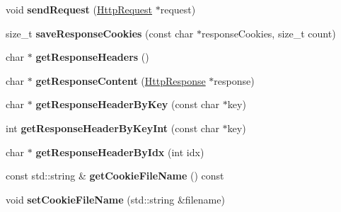 \begin{DoxyCompactItemize}
\mbox{\label{classnetwork_1_1HttpURLConnection_a83c0589023e5e1a82df8c7ce4e52a8de}} 
void {\bfseries send\+Request} (\hyperlink{classnetwork_1_1HttpRequest}{Http\+Request} $\ast$request)
\item 
\mbox{\label{classnetwork_1_1HttpURLConnection_a74069d196ac2556cbb0e0446bbc59b58}} 
size\+\_\+t {\bfseries save\+Response\+Cookies} (const char $\ast$response\+Cookies, size\+\_\+t count)
\item 
\mbox{\label{classnetwork_1_1HttpURLConnection_a2c2b751aacec3db9b9bda538a67337f9}} 
char $\ast$ {\bfseries get\+Response\+Headers} ()
\item 
\mbox{\label{classnetwork_1_1HttpURLConnection_aab13dc49babadc46b57d019f7a786c20}} 
char $\ast$ {\bfseries get\+Response\+Content} (\hyperlink{classnetwork_1_1HttpResponse}{Http\+Response} $\ast$response)
\item 
\mbox{\label{classnetwork_1_1HttpURLConnection_a96c181fa254daaffdb4e9336763a71c5}} 
char $\ast$ {\bfseries get\+Response\+Header\+By\+Key} (const char $\ast$key)
\item 
\mbox{\label{classnetwork_1_1HttpURLConnection_acc47cc640f30ff93e3d5d1f9ba5560d0}} 
int {\bfseries get\+Response\+Header\+By\+Key\+Int} (const char $\ast$key)
\item 
\mbox{\label{classnetwork_1_1HttpURLConnection_a47000e2aa054a0ffe633fec4082839cb}} 
char $\ast$ {\bfseries get\+Response\+Header\+By\+Idx} (int idx)
\item 
\mbox{\label{classnetwork_1_1HttpURLConnection_a8b2c2de1bbafbbe6a18607b3ace7a822}} 
const std\+::string \& {\bfseries get\+Cookie\+File\+Name} () const
\item 
\mbox{\label{classnetwork_1_1HttpURLConnection_a9679dadee623ce15aaa17ad19bf29e87}} 
void {\bfseries set\+Cookie\+File\+Name} (std\+::string \&filename)
\item 

\end{DoxyCompactItemize}
